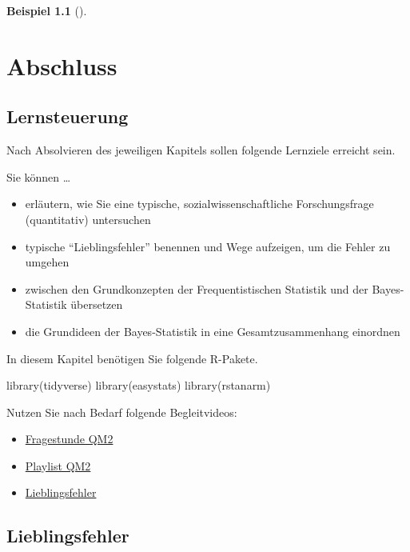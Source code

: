 \documentclass[
  ngerman,
  letterpaper,
  twoside,
  open=any]{scrbook}
\newenvironment{Shaded}{\begin{snugshade}}{\end{snugshade}}
\newcommand{\FunctionTok}[1]{\textcolor[rgb]{0.28,0.35,0.67}{#1}}
\newcommand{\NormalTok}[1]{\textcolor[rgb]{0.00,0.23,0.31}{#1}}
\providecommand{\tightlist}{%
  \setlength{\itemsep}{0pt}\setlength{\parskip}{0pt}}\usepackage{longtable,booktabs,array}
\theoremstyle{definition}
\newtheorem{example}{Beispiel}[chapter]
\theoremstyle{plain}
\theoremstyle{definition}
\theoremstyle{definition}
\theoremstyle{remark}
\begin{document}
\begin{example}[]
\chapter{Abschluss}\label{sec-abschluss}

\section{Lernsteuerung}\label{lernsteuerung-13}

Nach Absolvieren des jeweiligen Kapitels sollen folgende Lernziele
erreicht sein.

Sie können \ldots{}

\begin{itemize}
\tightlist
\item
  erläutern, wie Sie eine typische, sozialwissenschaftliche
  Forschungsfrage (quantitativ) untersuchen
\item
  typische ``Lieblingsfehler'' benennen und Wege aufzeigen, um die
  Fehler zu umgehen
\item
  zwischen den Grundkonzepten der Frequentistischen Statistik und der
  Bayes-Statistik übersetzen
\item
  die Grundideen der Bayes-Statistik in eine Gesamtzusammenhang
  einordnen
\end{itemize}

In diesem Kapitel benötigen Sie folgende R-Pakete.

\begin{Shaded}
\begin{Highlighting}[]
\FunctionTok{library}\NormalTok{(tidyverse)}
\FunctionTok{library}\NormalTok{(easystats)}
\FunctionTok{library}\NormalTok{(rstanarm)}
\end{Highlighting}
\end{Shaded}

Nutzen Sie nach Bedarf folgende Begleitvideos:

\begin{itemize}
\tightlist
\item
  \href{https://youtu.be/5nKy1hueZlIs}{Fragestunde QM2}
\item
  \href{https://www.youtube.com/playlist?list=PLRR4REmBgpIGVptiSN-qDVEJKfFnUqDyL}{Playlist
  QM2}
\item
  \href{https://youtu.be/imnicKTbStU}{Lieblingsfehler}
\end{itemize}

\section{Lieblingsfehler}\label{lieblingsfehler}


\end{example}
\end{document}
